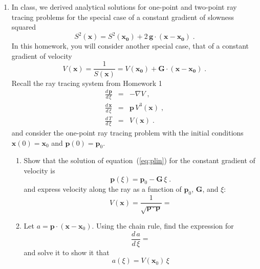 \begin{enumerate}

\item In class, we derived analytical solutions for one-point and
two-point ray tracing problems for the special case of a constant
gradient of slowness squared 
\begin{equation}
  \label{eq:s2}
  S^2(\mathbf{x}) =
  S^2(\mathbf{x_0})+2\,\mathbf{g} \cdot (\mathbf{x}-\mathbf{x_0})\;.
\end{equation}
In this homework, you will consider another special case, that of a
constant gradient of velocity
\begin{equation}
  \label{eq:v}
  V(\mathbf{x}) = \frac{1}{S(\mathbf{x})} =
  V(\mathbf{x_0})+\mathbf{G} \cdot (\mathbf{x}-\mathbf{x_0})\;.
\end{equation}
Recall the ray tracing system from Homework 1
\begin{eqnarray}
  \label{eq:plin}
  \frac{d\,\mathbf{p}}{d\,\xi} & = & -\nabla V\;, \\
  \label{eq:xlin}
  \frac{d\,\mathbf{x}}{d\,\xi} & = &
  \mathbf{p}\,V^3(\mathbf{x})\;, \\
  \label{eq:tlin}
  \frac{d\,T}{d\,\xi} & = & V(\mathbf{x})\;.
\end{eqnarray}
and consider the one-point ray tracing problem with the initial conditions
$\mathbf{x}(0)= \mathbf{x}_0$ and $\mathbf{p}(0)=\mathbf{p}_0$.
\begin{enumerate}
\item  Show that the solution of
equation~(\ref{eq:plin}) for the constant gradient of velocity is
\begin{equation}
  \label{eq:pcir}
  \mathbf{p}(\xi) =  \mathbf{p}_0 - \mathbf{G}\,\xi\;.
\end{equation}
and express velocity along the ray as a function of
  $\mathbf{p}_0$, $\mathbf{G}$, and $\xi$:
  \begin{equation}
\label{eq:vsol}
V(\mathbf{x}) = \frac{1}{\sqrt{\mathbf{p} \cdot \mathbf{p}}} = 
\end{equation}
\item Let $a = \mathbf{p} \cdot (\mathbf{x} - \mathbf{x}_0)$. Using
  the chain rule, find the expression for
  \begin{equation}
    \frac{d\,a}{d\,\xi} = 
  \end{equation}
  and solve it to show it that 
  \begin{equation}
    \label{eq:asol}
    a(\xi) = V(\mathbf{x}_0)\,\xi
  \end{equation}

\end{enumerate}
\end{enumerate}

